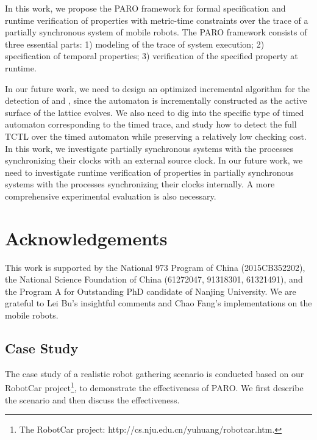 \documentclass[10pt,conference,compsocconf,letterpaper]{IEEEtran}
\begin{document}
In this work, we propose the \textsf{PARO} framework for formal specification and runtime verification of properties with metric-time constraints over the trace of a partially synchronous system of mobile robots. The \textsf{PARO} framework consists of three essential parts: 1) modeling of the trace of system execution; 2) specification of temporal properties; 3) verification of the specified property at runtime.

In our future work, we need to design an optimized incremental algorithm for the detection of  and , since the automaton  is incrementally constructed as the active surface of the lattice evolves. We also need to dig into the specific type of timed automaton corresponding to the timed trace, and study how to detect the full TCTL over the timed automaton while preserving a relatively low checking cost. In this work, we investigate partially synchronous systems with the processes synchronizing their clocks with an external source clock. In our future work, we need to investigate runtime verification of properties in partially synchronous systems with the processes synchronizing their clocks internally. A more comprehensive experimental evaluation is also necessary.

\section*{Acknowledgements}

This work is supported by the National 973 Program of China (2015CB352202), the National Science Foundation of China (61272047, 91318301, 61321491), and the Program A for Outstanding PhD candidate of Nanjing University. We are grateful to Lei Bu's insightful comments and Chao Fang's implementations on the mobile robots.




\newpage
\appendix

\subsection{Case Study}\label{sec:Case Study}

The case study of a realistic robot gathering scenario is conducted based on our RobotCar project\footnote{The RobotCar project: http://cs.nju.edu.cn/yuhuang/robotcar.htm.}, to demonstrate the effectiveness of \textsf{PARO}. We first describe the scenario and then discuss the effectiveness.
\end{document}
